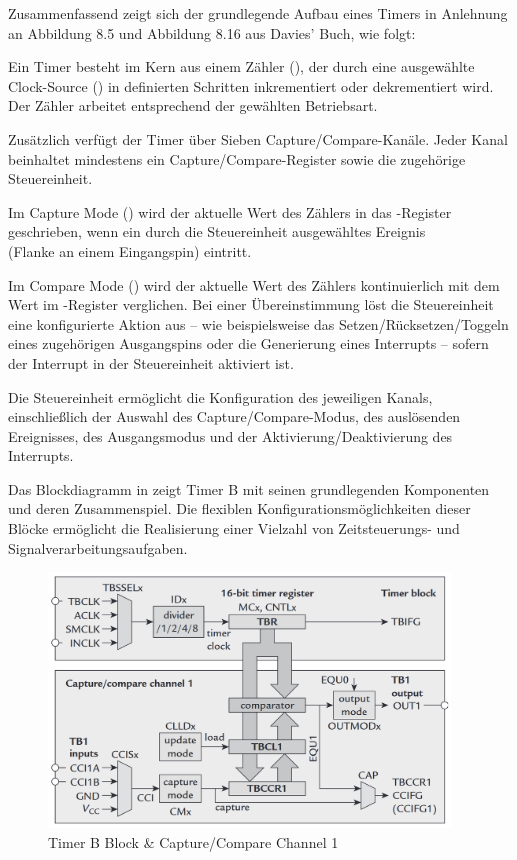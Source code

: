 Zusammenfassend zeigt sich der grundlegende Aufbau eines Timers in Anlehnung an Abbildung 8.5 und Abbildung 8.16 aus Davies' Buch, wie folgt:

Ein Timer besteht im Kern aus einem Z\"ahler (), der durch eine ausgew\"ahlte Clock-Source () in definierten Schritten inkrementiert oder dekrementiert wird. Der Z\"ahler arbeitet entsprechend der gew\"ahlten Betriebsart.

\newpage
Zus\"atzlich verf\"ugt der Timer \"uber Sieben Capture/Compare-Kan\"ale. Jeder Kanal beinhaltet mindestens ein Capture/Compare-Register sowie die zugeh\"orige Steuereinheit.

Im Capture Mode () wird der aktuelle Wert des Z\"ahlers in das -Register geschrieben, wenn ein durch die Steuereinheit ausgew\"ahltes Ereignis \\(\zB Flanke an einem Eingangspin) eintritt.

Im Compare Mode () wird der aktuelle Wert des Z\"ahlers kontinuierlich mit dem Wert im -Register verglichen. Bei einer \"Ubereinstimmung l\"ost die Steuereinheit eine konfigurierte Aktion aus -- wie beispielsweise das Setzen/R\"ucksetzen/Toggeln eines zugeh\"origen Ausgangspins oder die Generierung eines Interrupts -- sofern der Interrupt in der Steuereinheit aktiviert ist.

Die Steuereinheit erm\"oglicht die Konfiguration des jeweiligen Kanals, einschlie{\ss}lich der Auswahl des Capture/Compare-Modus, des ausl\"osenden Ereignisses, des Ausgangsmodus und der Aktivierung/Deaktivierung des Interrupts.

Das Blockdiagramm in  zeigt Timer B mit seinen grundlegenden Komponenten und deren Zusammenspiel. Die flexiblen Konfigurationsm\"oglichkeiten dieser Bl\"ocke erm\"oglicht die Realisierung einer Vielzahl von Zeitsteuerungs- und Signalverarbeitungsaufgaben.

\begin{figure}[h!]
	\centering
	\includegraphics[width=0.95\textwidth]{../Bilder/BlockDiagram_TimerB.png}
	\caption{Timer B Block \& Capture/Compare Channel 1\\}
	\label{fig:BlockDiagramm_Timer}
\end{figure}

